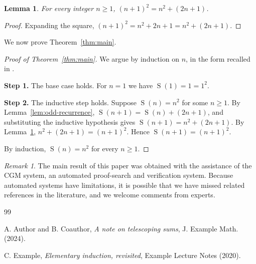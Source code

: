 \documentclass{amsart}
\theoremstyle{plain}
\newtheorem{lem}[thm]{Lemma}
\theoremstyle{definition}
\theoremstyle{remark}
\newtheorem{rem}[thm]{Remark}
\DeclareMathOperator{\Oddsum}{S}
\begin{document}
\begin{lem}\label{lem:square-recurrence}
For every integer $n \ge 1$, $(n+1)^2 = n^2 + (2n+1)$.
\end{lem}

\begin{proof}
Expanding the square, $(n+1)^2 = n^2 + 2n + 1 = n^2 + (2n+1)$.
\end{proof}

We now prove Theorem~\ref{thm:main}.

\begin{proof}[Proof of Theorem~\ref{thm:main}]
We argue by induction on $n$, in the form recalled in \cite[Section~1]{Exm20}.

\noindent\textbf{Step 1.} The base case holds. For $n = 1$ we have $\Oddsum(1) = 1 = 1^2$.

\noindent\textbf{Step 2.} The inductive step holds. Suppose $\Oddsum(n) = n^2$ for some $n \ge 1$. By Lemma~\ref{lem:odd-recurrence}, $\Oddsum(n+1) = \Oddsum(n) + (2n+1)$, and substituting the inductive hypothesis gives $\Oddsum(n+1) = n^2 + (2n+1)$. By Lemma~\ref{lem:square-recurrence}, $n^2 + (2n+1) = (n+1)^2$. Hence $\Oddsum(n+1) = (n+1)^2$.

By induction, $\Oddsum(n) = n^2$ for every $n \ge 1$.
\end{proof}

\begin{rem}
The main result of this paper was obtained with the assistance of the CGM system, an automated proof-search and verification system. Because automated systems have limitations, it is possible that we have missed related references in the literature, and we welcome comments from experts.
\end{rem}

\begin{thebibliography}{99}

A. Author and B. Coauthor,
\emph{A note on telescoping sums},
J. Example Math. (2024).

C. Example,
\emph{Elementary induction, revisited},
Example Lecture Notes (2020).

\end{thebibliography}
\end{document}
